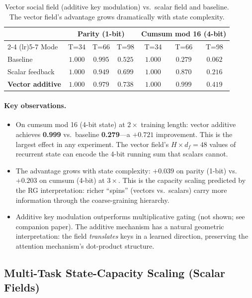 \documentclass[11pt,a4paper]{article}
\begin{document}
\begin{table}[h]
\centering
\caption{Vector social field (additive key modulation) vs.\ scalar
  field and baseline.  The vector field's advantage grows
  dramatically with state complexity.}
\label{tab:vector-results}
\begin{tabular}{@{}lcccccc@{}}
\toprule
& \multicolumn{3}{c}{\textbf{Parity (1-bit)}}
& \multicolumn{3}{c}{\textbf{Cumsum mod 16 (4-bit)}} \\
\cmidrule(lr){2-4} \cmidrule(lr){5-7}
Mode & T=34 & T=66 & T=98
     & T=34 & T=66 & T=98 \\
\midrule
Baseline
  & $1.000$ & $0.995$ & $0.525$
  & $1.000$ & $0.279$ & $0.062$ \\
Scalar feedback
  & $1.000$ & $0.949$ & $0.699$
  & $1.000$ & $0.870$ & $0.216$ \\
\textbf{Vector additive}
  & $1.000$ & $0.979$ & $\mathbf{0.738}$
  & $1.000$ & $\mathbf{0.999}$ & $\mathbf{0.419}$ \\
\bottomrule
\end{tabular}
\end{table}

\paragraph{Key observations.}
\begin{itemize}
  \item On cumsum mod 16 (4-bit state) at $2\times$ training length:
    vector additive achieves \textbf{0.999} vs.\ baseline
    \textbf{0.279}---a $+0.721$ improvement.  This is the largest
    effect in any experiment.  The vector field's $H \times d_f = 48$
    values of recurrent state can encode the 4-bit running sum that
    scalars cannot.
  \item The advantage grows with state complexity: $+0.039$ on parity
    (1-bit) vs.\ $+0.203$ on cumsum (4-bit) at $3\times$.  This is
    the capacity scaling predicted by the RG interpretation: richer
    ``spins'' (vectors vs.\ scalars) carry more information through
    the coarse-graining hierarchy.
  \item Additive key modulation outperforms multiplicative gating
    (not shown; see companion paper).  The additive mechanism has a
    natural geometric interpretation: the field \emph{translates}
    keys in a learned direction, preserving the attention mechanism's
    dot-product structure.
\end{itemize}

\subsection{Multi-Task State-Capacity Scaling (Scalar Fields)}
\end{document}
